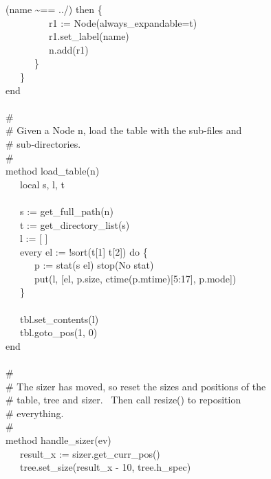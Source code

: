 {(name \~{}== {\textquotedbl}../{\textquotedbl}) then \{ \\
\>   \ \ \ \ \ \ \ \ \ r1 :=
Node({\textquotedbl}always\_expandable=t{\textquotedbl}) \\
\>   \ \ \ \ \ \ \ \ \ r1.set\_label(name) \\
\>   \ \ \ \ \ \ \ \ \ n.add(r1) \\
\>   \ \ \ \ \ \ \} \\
\>   \ \ \ \} \\
\>   end \\
\ \\
\>   \# \\
\>   \# Given a Node n, load the table with the sub-files and \\
\>   \# sub-directories. \\
\>   \# \\
\>   method load\_table(n) \\
\>   \ \ \ local s, l, t \\
\ \\
\>   \ \ \ s := get\_full\_path(n) \\
\>   \ \ \ t := get\_directory\_list(s) \\
\>   \ \ \ l := [ ] \\
\>   \ \ \ every el := !sort(t[1] {\textbar}{\textbar}{\textbar} t[2])
do \{ \\
\>   \ \ \ \ \ \ p := stat(s {\textbar}{\textbar} el) {\textbar}
stop({\textquotedbl}No stat{\textquotedbl}) \\
\>   \ \ \ \ \ \ put(l, [el, p.size, ctime(p.mtime)[5:17], p.mode]) \\
\>   \ \ \ \} \\
\ \\
\>   \ \ \ tbl.set\_contents(l) \\
\>   \ \ \ tbl.goto\_pos(1, 0) \\
\>   end \\
\ \\
\>   \# \\
\>   \# The sizer has moved, so reset the sizes and positions of the \\
\>   \# table, tree and sizer. \ Then call resize() to reposition \\
\>   \# everything. \\
\>   \# \\
\>   method handle\_sizer(ev) \\
\>   \ \ \ result\_x := sizer.get\_curr\_pos() \\
\>   \ \ \ tree.set\_size(result\_x - 10, tree.h\_spec) \\
}
